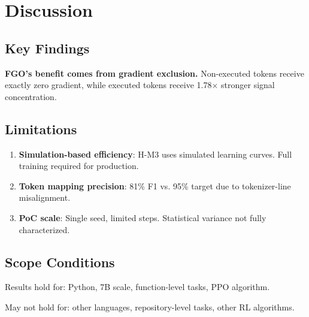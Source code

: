 \section{Discussion}

\subsection{Key Findings}

\textbf{FGO's benefit comes from gradient exclusion.} Non-executed tokens receive exactly zero gradient, while executed tokens receive 1.78$\times$ stronger signal concentration.

\subsection{Limitations}

\begin{enumerate}
    \item \textbf{Simulation-based efficiency}: H-M3 uses simulated learning curves. Full training required for production.
    \item \textbf{Token mapping precision}: 81\% F1 vs. 95\% target due to tokenizer-line misalignment.
    \item \textbf{PoC scale}: Single seed, limited steps. Statistical variance not fully characterized.
\end{enumerate}

\subsection{Scope Conditions}

Results hold for: Python, 7B scale, function-level tasks, PPO algorithm.

May not hold for: other languages, repository-level tasks, other RL algorithms.
